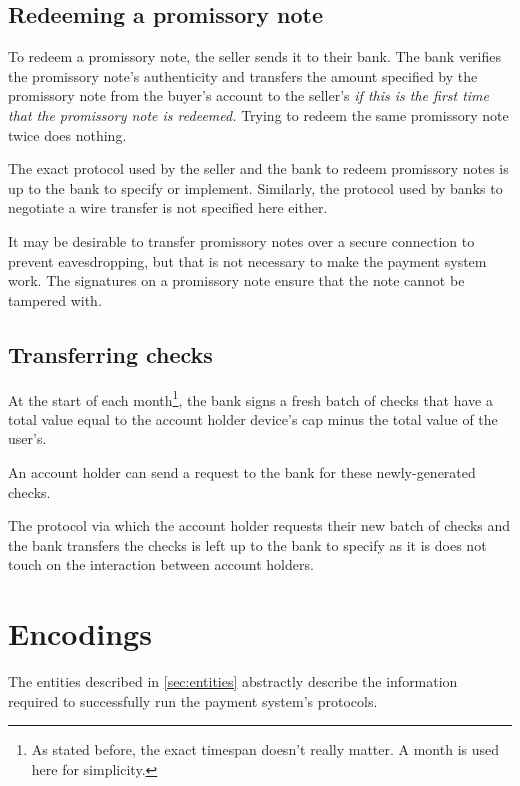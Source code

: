 \documentclass[12pt,a4paper]{article}
\begin{document}
\begin{multicols}{2}
	\subsection{Redeeming a promissory note}

	To redeem a promissory note, the seller sends it to their bank. The bank verifies the promissory note's authenticity and transfers the amount specified by the promissory note from the buyer's account to the seller's \emph{if this is the first time that the promissory note is redeemed.} Trying to redeem the same promissory note twice does nothing. 

	The exact protocol used by the seller and the bank to redeem promissory notes is up to the bank to specify or implement. Similarly, the protocol used by banks to negotiate a wire transfer is not specified here either.

	It may be desirable to transfer promissory notes over a secure connection to prevent eavesdropping, but that is not necessary to make the payment system work. The signatures on a promissory note ensure that the note cannot be tampered with.
	

	\subsection{Transferring checks}

	At the start of each month\footnote{As stated before, the exact timespan doesn't really matter. A month is used here for simplicity.}, the bank signs a fresh batch of checks that have a total value equal to the account holder device's cap minus the total value of the user's.

	An account holder can send a request to the bank for these newly-generated checks.

	The protocol via which the account holder requests their new batch of checks and the bank transfers the checks is left up to the bank to specify as it is does not touch on the interaction between account holders.
	
	
	\section{Encodings}
	
	The entities described in \autoref{sec:entities} abstractly describe the information required to successfully run the payment system's protocols.
	

\end{multicols}
\end{document}

